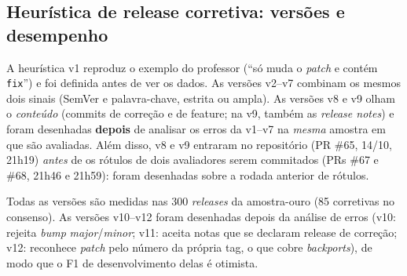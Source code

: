 \subsection{Heurística de release corretiva: versões e desempenho}\label{sec:heuristica}
A heurística v1 reproduz o exemplo do professor (``só muda o \textit{patch} e contém \texttt{fix}'') e foi
definida antes de ver os dados. As versões v2--v7 combinam os mesmos dois sinais (SemVer e palavra-chave,
estrita ou ampla). As versões v8 e v9 olham o \emph{conteúdo} (commits de correção e de feature; na v9,
também as \textit{release notes}) e foram desenhadas \textbf{depois} de analisar os erros da v1--v7 na
\emph{mesma} amostra em que são avaliadas. Além disso, v8 e v9 entraram no repositório (PR \#65, 14/10,
21h19) \emph{antes} de os rótulos de dois avaliadores serem commitados (PRs \#67 e \#68, 21h46 e 21h59):
foram desenhadas sobre a rodada anterior de rótulos.

Todas as versões são medidas nas 300 \textit{releases} da amostra-ouro (85 corretivas no consenso). As
versões v10--v12 foram desenhadas depois da análise de erros (v10: rejeita \textit{bump} \emph{major}/\emph{minor};
v11: aceita notas que se declaram release de correção; v12: reconhece \textit{patch} pelo número da própria
tag, o que cobre \textit{backports}), de modo que o F1 de desenvolvimento delas é otimista.

